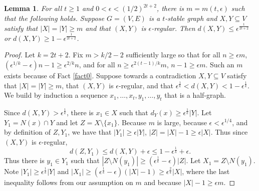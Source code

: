 \documentclass[11pt]{article}
\newtheorem{lemma}{Lemma}
\theoremstyle{definition}
\begin{document}
\begin{lemma}\label{lemma1}
For all $t\geq 1$ and $0<\epsilon<(1/2)^{2t+2}$, there is $m=m(t,\epsilon)$ such that the following holds.  Suppose $G=(V,E)$ is a $t$-stable graph and $X, Y\subseteq V$ satisfy that $|X|=|Y|\geq m$ and that $(X,Y)$ is $\epsilon$-regular.  Then $d(X,Y)\leq \epsilon^{\frac{1}{2t+2}}$ or $d(X,Y)\geq 1-\epsilon^{\frac{1}{2t+2}}$.
\end{lemma}
\begin{proof}
Let $k=2t+2$.  Fix $m>k/2-2$ sufficiently large so that for all $n\geq \epsilon m$, $(\epsilon^{1/k}-\epsilon)n-1\geq \epsilon^{2/k}n$, and for all $n\geq \epsilon^{2(t-1)/k}m$, $n-1\geq \epsilon m$.  Such an $m$ exists because of Fact \ref{fact0}. Suppose towards a contradiction $X, Y\subseteq V$ satisfy that $|X|=|Y|\geq m$, that $(X,Y)$ is $\epsilon$-regular, and that $\epsilon^{\frac{1}{k}} < d(X,Y)< 1-\epsilon^{\frac{1}{k}}$.  We build by induction a sequence $x_1,\ldots, x_t,y_1,\ldots, y_t$ that is a half-graph.

Since $d(X,Y)>\epsilon^{\frac{1}{k}}$, there is $x_1\in X$ such that $d_Y(x)\geq \epsilon^{\frac{1}{k}} |Y|$.  Let $Y_1=N(x)\cap Y$ and let $Z=X\setminus \{x_1\}$.  Because $m$ is large, because $\epsilon<\epsilon^{1/4}$, and by definition of $Z,Y_1$, we have that $|Y_1|\geq \epsilon|Y|$, $|Z|=|X|-1\geq \epsilon |X|$.  Thus since $(X,Y)$ is $\epsilon$-regular, 
$$
d(Z,Y_1)\leq d(X,Y)+\epsilon\leq 1-\epsilon^{\frac{1}{k}}+\epsilon.
$$
Thus there is $y_1\in Y_1$ such that $|Z\setminus N(y_1)|\geq (\epsilon^{\frac{1}{k}}-\epsilon)|Z|$.  Let $X_1=Z\setminus N(y_1)$.  Note $|Y_1|\geq \epsilon^{\frac{1}{k}} |Y|$ and $|X_1|\geq (\epsilon^{\frac{1}{k}}-\epsilon)(|X|-1)\geq \epsilon^{\frac{2}{k}}|X|$, where the last inequality follows from our assumption on $m$ and because $|X|-1\geq \epsilon m$.


\end{proof}
\end{document}
